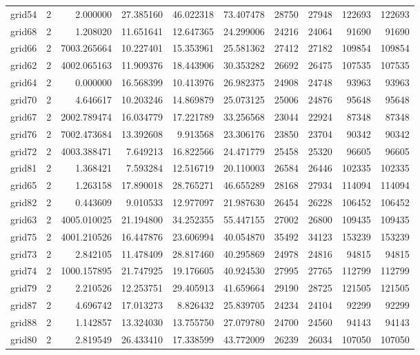\begin{longtable}{|l|r|r|r|r|r|r|r|r|r|}
grid54 & 2 & 2.000000 & 27.385160 & 46.022318 & 73.407478 & 28750 & 27948 & 122693 & 122693 \\
grid68 & 2 & 1.208020 & 11.651641 & 12.647365 & 24.299006 & 24216 & 24064 & 91690 & 91690 \\
grid66 & 2 & 7003.265664 & 10.227401 & 15.353961 & 25.581362 & 27412 & 27182 & 109854 & 109854 \\
grid62 & 2 & 4002.065163 & 11.909376 & 18.443906 & 30.353282 & 26692 & 26475 & 107535 & 107535 \\
grid64 & 2 & 0.000000 & 16.568399 & 10.413976 & 26.982375 & 24908 & 24748 & 93963 & 93963 \\
grid70 & 2 & 4.646617 & 10.203246 & 14.869879 & 25.073125 & 25006 & 24876 & 95648 & 95648 \\
grid67 & 2 & 2002.789474 & 16.034779 & 17.221789 & 33.256568 & 23044 & 22924 & 87348 & 87348 \\
grid76 & 2 & 7002.473684 & 13.392608 & 9.913568 & 23.306176 & 23850 & 23704 & 90342 & 90342 \\
grid72 & 2 & 4003.388471 & 7.649213 & 16.822566 & 24.471779 & 25458 & 25320 & 96605 & 96605 \\
grid81 & 2 & 1.368421 & 7.593284 & 12.516719 & 20.110003 & 26584 & 26446 & 102335 & 102335 \\
grid65 & 2 & 1.263158 & 17.890018 & 28.765271 & 46.655289 & 28168 & 27934 & 114094 & 114094 \\
grid82 & 2 & 0.443609 & 9.010533 & 12.977097 & 21.987630 & 26454 & 26228 & 106452 & 106452 \\
grid63 & 2 & 4005.010025 & 21.194800 & 34.252355 & 55.447155 & 27002 & 26800 & 109435 & 109435 \\
grid75 & 2 & 4001.210526 & 16.447876 & 23.606994 & 40.054870 & 35492 & 34123 & 153239 & 153239 \\
grid73 & 2 & 2.842105 & 11.478409 & 28.817460 & 40.295869 & 24978 & 24816 & 94815 & 94815 \\
grid74 & 2 & 1000.157895 & 21.747925 & 19.176605 & 40.924530 & 27995 & 27765 & 112799 & 112799 \\
grid79 & 2 & 2.210526 & 12.253751 & 29.405913 & 41.659664 & 29190 & 28725 & 121505 & 121505 \\
grid87 & 2 & 4.696742 & 17.013273 & 8.826432 & 25.839705 & 24234 & 24104 & 92299 & 92299 \\
grid88 & 2 & 1.142857 & 13.324030 & 13.755750 & 27.079780 & 24700 & 24560 & 94143 & 94143 \\
grid80 & 2 & 2.819549 & 26.433410 & 17.338599 & 43.772009 & 26239 & 26034 & 107050 & 107050 \\

\end{longtable}
